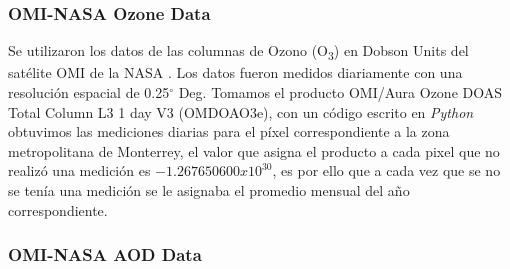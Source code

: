 \subsubsection{OMI-NASA Ozone Data}
Se utilizaron los datos de las columnas de Ozono (O\textsubscript{3}) en Dobson Units del satélite OMI de la NASA \cite{OMI_ozone}. Los datos fueron medidos diariamente con una resolución espacial de 0.25$^{\circ}$ Deg. Tomamos el producto OMI/Aura Ozone DOAS Total Column L3 1 day V3 (OMDOAO3e), con un código escrito en \textit{Python} obtuvimos las mediciones diarias para el píxel correspondiente a la zona metropolitana de Monterrey, el valor que asigna el producto a cada pixel que no realizó una medición es $-1.267650600x10^{30}$, es por ello que a cada vez que se no se tenía una medición se le asignaba el promedio mensual del año correspondiente.
\subsubsection{OMI-NASA AOD Data}